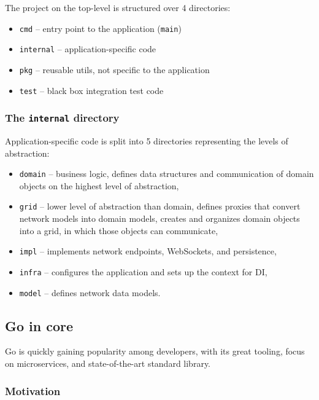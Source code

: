 The project on the top-level is structured over 4 directories:

\begin{itemize}
\tightlist
\item
  \texttt{cmd} -- entry point to the application (\texttt{main})
\item
  \texttt{internal} -- application-specific code
\item
  \texttt{pkg} -- reusable utils, not specific to the application
\item
  \texttt{test} -- black box integration test code
\end{itemize}

\hypertarget{the-internal-directory}{%
\subsubsection{\texorpdfstring{The \texttt{internal}
directory}{The internal directory}}\label{the-internal-directory}}

Application-specific code is split into 5 directories representing the
levels of abstraction:

\begin{itemize}
\tightlist
\item
  \texttt{domain} -- business logic, defines data structures and
  communication of domain objects on the highest level of abstraction,
\item
  \texttt{grid} -- lower level of abstraction than domain, defines
  proxies that convert network models into domain models, creates and
  organizes domain objects into a grid, in which those objects can
  communicate,
\item
  \texttt{impl} -- implements network endpoints, WebSockets, and
  persistence,
\item
  \texttt{infra} -- configures the application and sets up the context
  for DI,
\item
  \texttt{model} -- defines network data models.
\end{itemize}

\hypertarget{go-in-core}{%
\subsection{Go in core}\label{go-in-core}}

Go is quickly gaining popularity among developers, with its great
tooling, focus on microservices, and state-of-the-art standard library.

\hypertarget{motivation}{%
\subsubsection{Motivation}\label{motivation}}

